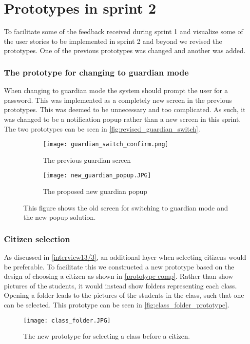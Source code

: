 \section{Prototypes in sprint 2}
To facilitate some of the feedback received during sprint 1 and visualize some of the user stories to be implemented in sprint 2 and beyond we revised the prototypes.
One of the previous prototypes was changed and another was added.

\subsubsection{The prototype for changing to guardian mode}
When changing to guardian mode the system should prompt the user for a password.
This was implemented as a completely new screen in the previous prototypes.
This was deemed to be unnecessary and too complicated.
As such, it was changed to be a notification popup rather than a new screen in this sprint.
The two prototypes can be seen in \autoref{fig:revised_guardian_switch}.

\begin{figure}[H]
    \begin{subfigure}{0.5\textwidth}
    \texttt{[image: guardian\_switch\_confirm.png]} 
    \caption{The previous guardian screen}
    \label{fig:previous_guardian_screen}
    \end{subfigure}
    \begin{subfigure}{0.5\textwidth}
        \texttt{[image: new\_guardian\_popup.JPG]}
    \caption{The proposed new guardian popup}
    \label{fig:new_guardian_popup}
    \end{subfigure} 
    \caption{This figure shows the old screen for switching to guardian mode and the new popup solution.}
    \label{fig:revised_guardian_switch}
\end{figure}

\subsubsection{Citizen selection}
As discussed in \autoref{interview13/3}, an additional layer when selecting citizens would be preferable.
To facilitate this we constructed a new prototype based on the design of choosing a citizen as shown in \autoref{prototype-comp}.
Rather than show pictures of the students, it would instead show folders representing each class.
Opening a folder leads to the pictures of the students in the class, such that one can be selected.
This prototype can be seen in \autoref{fig:class_folder_prototype}.

\begin{figure}[h]
    \centering
    \texttt{[image: class\_folder.JPG]}
    \caption{The new prototype for selecting a class before a citizen.}
    \label{fig:class_folder_prototype}
  \end{figure}
